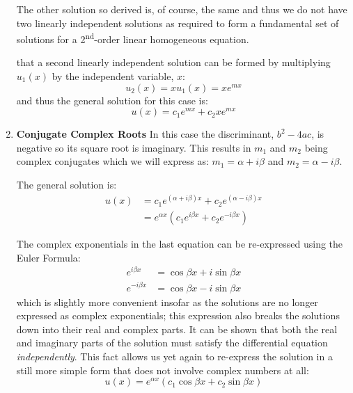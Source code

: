 \begin{enumerate}
The other solution so derived is, of course, the same and thus we do not have two linearly independent solutions as required to form a fundamental set of solutions for a 2\textsuperscript{nd}-order linear homogeneous equation.  

 that a second linearly independent solution can be formed by multiplying $u_1(x)$ by the independent variable, $x$:
\begin{equation*}
u_2(x) = x u_1(x) = xe^{mx}
\end{equation*}
and thus the general solution for this case is:
\begin{equation}
u(x) = c_1e^{mx}+c_2xe^{mx}
\label{eq:rep-real-roots}
\end{equation}

\item \textbf{Conjugate Complex Roots}
In this case the discriminant, $b^2-4ac$, is negative so its square root is imaginary.  This results in $m_1$ and $m_2$ being complex conjugates which we will express as: $m_1 = \alpha + i\beta$ and $m_2 = \alpha - i\beta$.

The general solution is:
\begin{align*}
u(x) &= c_1e^{(\alpha + i\beta)x}+c_2e^{(\alpha - i\beta)x} \\
&=e^{\alpha x}\left(c_1e^{i\beta x} + c_2e^{-i\beta x} \right) 
\end{align*}

The complex exponentials in the last equation can be re-expressed using the Euler Formula:
\begin{align*}
e^{i\beta x} &= \cos{\beta x} + i \sin{\beta x} \\
e^{-i\beta x} &= \cos{\beta x} - i \sin{\beta x}
\end{align*}
which is slightly more convenient insofar as the solutions are no longer expressed as complex exponentials; this expression also breaks the solutions down into their real and complex parts. It can be shown that both the real and imaginary parts of the solution must satisfy the differential equation \emph{independently}.  This fact allows us yet again to re-express the solution in a still more simple form that does not involve complex numbers at all:
\begin{equation}
u(x) = e^{\alpha x}\left(c_1 \cos{\beta x} + c_2 \sin{\beta x} \right)
\label{eq:cmplx-conj-roots}
\end{equation}


\end{enumerate}
